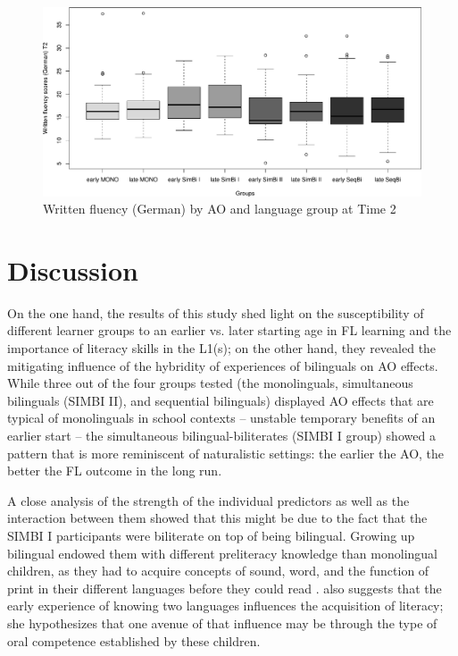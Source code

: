 \documentclass[output=paper,modfonts,nonflat,newtxmath]{langsci/langscibook}
\begin{document}
\begin{figure}%
\includegraphics[width=\textwidth]{figures/PfenningerFigure11.pdf}
\caption{\label{fig:pfenninger:11} Written fluency (German) by AO and language group at Time 2}
\end{figure}

\section{Discussion}

On the one hand, the results of this study shed light on the susceptibility of different learner groups to an earlier vs. later starting age in FL learning and the importance of literacy skills in the L1(s); on the other hand, they revealed the mitigating influence of the hybridity of experiences of bilinguals on AO effects. While three out of the four groups tested (the monolinguals, simultaneous bilinguals (SIMBI II), and sequential bilinguals) displayed AO effects that are typical of monolinguals in school contexts – unstable temporary benefits of an earlier start – the simultaneous bilingual-biliterates (SIMBI I group) showed a pattern that is more reminiscent of naturalistic settings: the earlier the AO, the better the FL outcome in the long run.

A close analysis of the strength of the individual predictors as well as the interaction between them showed that this might be due to the fact that the SIMBI I participants were biliterate on top of being bilingual. Growing up bilingual endowed them with different preliteracy knowledge than monolingual children, as they had to acquire concepts of sound, word, and the function of print in their different languages before they could read \citep{Bialystok2007}. \citet{Bialystok2007} also suggests that the early experience of knowing two languages influences the acquisition of literacy; she hypothesizes that one avenue of that influence may be through the type of oral competence established by these children.
\end{document}
